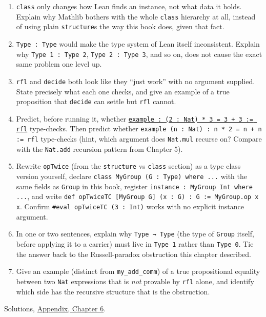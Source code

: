 \begin{enumerate}
\def\labelenumi{\arabic{enumi}.}
\tightlist
\item
  \texttt{class} only changes how Lean finds an instance, not what data it holds. Explain why Mathlib bothers with the whole \texttt{class} hierarchy at all, instead of using plain \texttt{structure}s the way this book does, given that fact.
\item
  \texttt{Type : Type} would make the type system of Lean itself inconsistent. Explain why \texttt{Type 1 : Type 2}, \texttt{Type 2 : Type 3}, and so on, does not cause the exact same problem one level up.
\item
  \texttt{rfl} and \texttt{decide} both look like they ``just work'' with no argument supplied. State precisely what each one checks, and give an example of a true proposition that \texttt{decide} can settle but \texttt{rfl} cannot.
\item
  Predict, before running it, whether \href{https://lean-lang.org/doc/reference/latest/Tactic-Proofs/Tactic-Reference/}{\texttt{example : (2 : Nat) * 3 = 3 + 3 := rfl}} type-checks. Then predict whether \texttt{example (n : Nat) : n * 2 = n + n := rfl} type-checks (hint, which argument does \texttt{Nat.mul} recurse on? Compare with the \texttt{Nat.add} recursion pattern from Chapter 5).
\item
  Rewrite \texttt{opTwice} (from the \texttt{structure} vs \texttt{class} section) as a type class version yourself, declare \texttt{class MyGroup (G : Type) where ...} with the same fields as \texttt{Group} in this book, register \texttt{instance : MyGroup Int where ...}, and write \texttt{def opTwiceTC [MyGroup G] (x : G) : G := MyGroup.op x x}. Confirm \texttt{\#eval opTwiceTC (3 : Int)} works with no explicit instance argument.
\item
  In one or two sentences, explain why \texttt{Type → Type} (the type of \texttt{Group} itself, before applying it to a carrier) must live in \texttt{Type 1} rather than \texttt{Type 0}. Tie the answer back to the Russell-paradox obstruction this chapter described.
\item
  Give an example (distinct from \texttt{my\_\allowbreak{}add\_\allowbreak{}comm}) of a true propositional equality between two \texttt{Nat} expressions that is \emph{not} provable by \texttt{rfl} alone, and identify which side has the recursive structure that is the obstruction.
\end{enumerate}

Solutions, \hyperref[sec:15-appendix-solutions:06-chapter-6:1]{Appendix, Chapter 6}.

